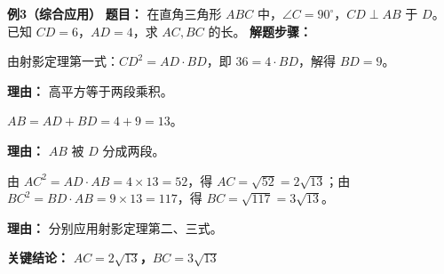 \begin{examplebox}
	\medskip
	\textbf{\textcolor{CExample}{例3（综合应用）}}
	\textbf{\textcolor{CExample}{题目：}}
	在直角三角形 $ABC$ 中，$\angle C = 90^\circ$，$CD \perp AB$ 于 $D$。已知 $CD = 6$，$AD = 4$，求 $AC, BC$ 的长。
	\textbf{\textcolor{CExample}{解题步骤：}}
	\begin{description}[style=nextline, leftmargin=2.8em, labelsep=0.5em, itemsep=0.45em]
		\item[\textbf{第一步（求另一段）：}]
			由射影定理第一式：$CD^2 = AD \cdot BD$，即 $36 = 4 \cdot BD$，解得 $BD = 9$。
			\par\textbf{理由：} 高平方等于两段乘积。
		\item[\textbf{第二步（求斜边长）：}]
			$AB = AD + BD = 4 + 9 = 13$。
			\par\textbf{理由：} $AB$ 被 $D$ 分成两段。
		\item[\textbf{第三步（求直角边）：}]
			由 $AC^2 = AD \cdot AB = 4 \times 13 = 52$，得 $AC = \sqrt{52} = 2\sqrt{13}$；由 $BC^2 = BD \cdot AB = 9 \times 13 = 117$，得 $BC = \sqrt{117} = 3\sqrt{13}$。
			\par\textbf{理由：} 分别应用射影定理第二、三式。
	\end{description}
	\textbf{\textcolor{CExample}{关键结论：}}
	\textbf{$AC = 2\sqrt{13}$，$BC = 3\sqrt{13}$}
\end{examplebox}

